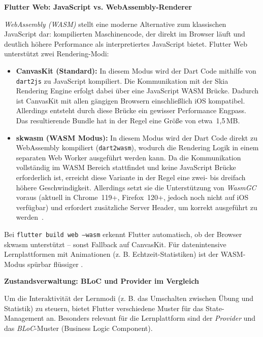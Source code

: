 \textbf{Flutter Web: JavaScript vs. WebAssembly-Renderer}

\textit{WebAssembly (WASM)} stellt eine moderne Alternative zum klassischen JavaScript dar: kompilierten Maschinencode, der direkt im Browser läuft und deutlich höhere Performance als interpretiertes JavaScript bietet. Flutter Web unterstützt zwei Rendering-Modi:

\begin{itemize}
  \item \textbf{CanvasKit (Standard):}  
  In diesem Modus wird der Dart Code mithilfe von \texttt{dart2js} zu JavaScript kompiliert. 
  Die Kommunikation mit der Skia Rendering Engine erfolgt dabei über eine JavaScript WASM Brücke. 
  Dadurch ist CanvasKit mit allen gängigen Browsern einschließlich iOS kompatibel. 
  Allerdings entsteht durch diese Brücke ein gewisser Performance Engpass. 
  Das resultierende Bundle hat in der Regel eine Größe von etwa~1{,}5\,MB.

  \item \textbf{skwasm (WASM Modus):}  
  In diesem Modus wird der Dart Code direkt zu WebAssembly kompiliert (\texttt{dart2wasm}), 
  wodurch die Rendering Logik in einem separaten Web Worker ausgeführt werden kann. 
  Da die Kommunikation vollständig im WASM Bereich stattfindet und keine JavaScript Brücke erforderlich ist, 
  erreicht diese Variante in der Regel eine zwei- bis dreifach höhere Geschwindigkeit. 
  Allerdings setzt sie die Unterstützung von \textit{WasmGC} voraus (aktuell in Chrome~119+, Firefox~120+, 
  jedoch noch nicht auf iOS verfügbar) und erfordert zusätzliche Server Header, 
  um korrekt ausgeführt zu werden~\cite{FlutterCanvasKit}.
\end{itemize}

Bei \texttt{flutter build web --wasm} erkennt Flutter automatisch, ob der Browser skwasm unterstützt – sonst Fallback auf CanvasKit. Für datenintensive Lernplattformen mit Animationen (z. B. Echtzeit-Statistiken) ist der WASM-Modus spürbar flüssiger \cite{FlutterWasm}.

\vspace{0.7cm}
\textbf{Zustandsverwaltung: BLoC und Provider im Vergleich}

Um die Interaktivität der Lernmodi (z. B. das Umschalten zwischen Übung und Statistik) zu steuern, bietet Flutter verschiedene Muster für das State-Management an. Besonders relevant für die Lernplattform sind der \textit{Provider} und das \textit{BLoC}-Muster (Business Logic Component).

